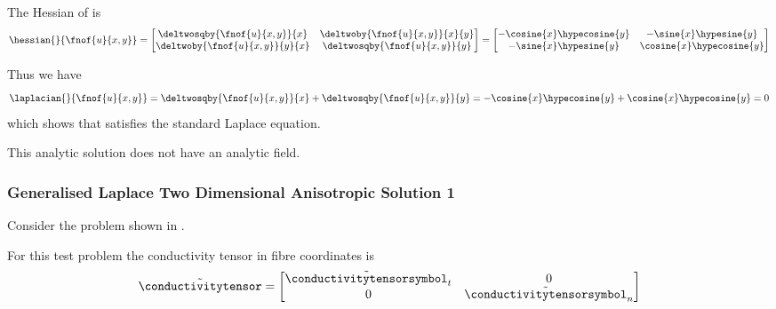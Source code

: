 The Hessian of  is
\begin{equation}
  \hessian{}{\fnof{u}{x,y}}=\begin{bmatrix}
  \deltwosqby{\fnof{u}{x,y}}{x} & \deltwoby{\fnof{u}{x,y}}{x}{y} \\
  \deltwoby{\fnof{u}{x,y}}{y}{x} & \deltwosqby{\fnof{u}{x,y}}{y}
  \end{bmatrix}=\begin{bmatrix}
  -\cosine{x}\hypecosine{y} & -\sine{x}\hypesine{y} \\
  -\sine{x}\hypesine{y} & \cosine{x}\hypecosine{y}
  \end{bmatrix}
  \label{eqn:StandardLaplaceTwoDAnalyticHessian2}
\end{equation}

Thus we have
\begin{equation}
  \laplacian{}{\fnof{u}{x,y}}=\deltwosqby{\fnof{u}{x,y}}{x}+\deltwosqby{\fnof{u}{x,y}}{y}=-\cosine{x}\hypecosine{y}+
  \cosine{x}\hypecosine{y}=0
\end{equation}
which shows that  satisfies the standard Laplace equation.

This analytic solution does not have an analytic field.

\subsubsection{Generalised Laplace Two Dimensional Anisotropic Solution 1}

Consider the problem shown in .


For this test problem the conductivity tensor in fibre coordinates is
\begin{equation}
  \tilde{\conductivitytensor}=\begin{bmatrix}
    \tilde{\conductivitytensorsymbol}_{t} & 0 \\ 
    0 & \tilde{\conductivitytensorsymbol}_{n}
  \end{bmatrix}
\end{equation}

